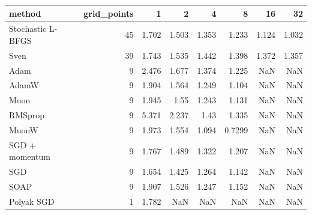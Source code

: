 \begin{tabular}{lrrrrrrr}
\toprule
method & grid\_points & 1 & 2 & 4 & 8 & 16 & 32 \\
\midrule
Stochastic L-BFGS & 45 & 1.702 & 1.503 & 1.353 & 1.233 & 1.124 & 1.032 \\
Sven & 39 & 1.743 & 1.535 & 1.442 & 1.398 & 1.372 & 1.357 \\
Adam & 9 & 2.476 & 1.677 & 1.374 & 1.225 & NaN & NaN \\
AdamW & 9 & 1.904 & 1.564 & 1.249 & 1.104 & NaN & NaN \\
Muon & 9 & 1.945 & 1.55 & 1.243 & 1.131 & NaN & NaN \\
RMSprop & 9 & 5.371 & 2.237 & 1.43 & 1.335 & NaN & NaN \\
MuonW & 9 & 1.973 & 1.554 & 1.094 & 0.7299 & NaN & NaN \\
SGD + momentum & 9 & 1.767 & 1.489 & 1.322 & 1.207 & NaN & NaN \\
SGD & 9 & 1.654 & 1.425 & 1.264 & 1.142 & NaN & NaN \\
SOAP & 9 & 1.907 & 1.526 & 1.247 & 1.152 & NaN & NaN \\
Polyak SGD & 1 & 1.782 & NaN & NaN & NaN & NaN & NaN \\
\bottomrule
\end{tabular}
